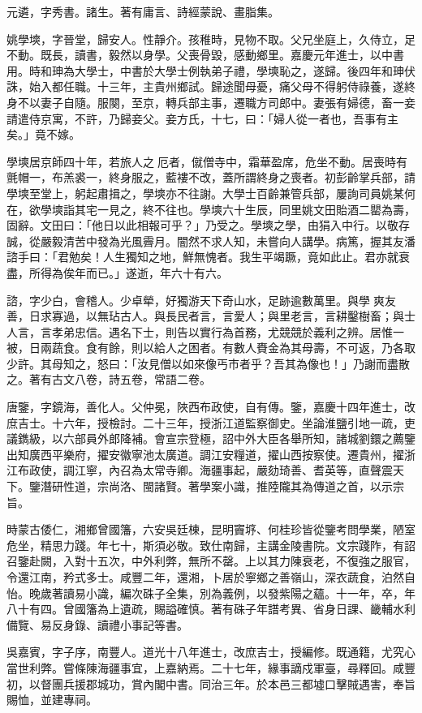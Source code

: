 \begin{pinyinscope}
元遴，字秀書。諸生。著有庸言、詩經蒙說、畫脂集。

姚學塽，字晉堂，歸安人。性靜介。孩稚時，見物不取。父兄坐庭上，久侍立，足不動。既長，讀書，毅然以身學。父喪骨毀，感動鄉里。嘉慶元年進士，以中書用。時和珅為大學士，中書於大學士例執弟子禮，學塽恥之，遂歸。後四年和珅伏誅，始入都任職。十三年，主貴州鄉試。歸途聞母憂，痛父母不得躬侍祿養，遂終身不以妻子自隨。服闋，至京，轉兵部主事，遷職方司郎中。妻張有婦德，畜一妾請遣侍京寓，不許，乃歸妾父。妾方氏，十七，曰：「婦人從一者也，吾事有主矣。」竟不嫁。

學塽居京師四十年，若旅人之厄者，僦僧寺中，霜華盈席，危坐不動。居喪時有氈帽一，布羔裘一，終身服之，藍褸不改，蓋所謂終身之喪者。初彭齡掌兵部，請學塽至堂上，躬起肅揖之，學塽亦不往謝。大學士百齡兼管兵部，屢詢司員姚某何在，欲學塽詣其宅一見之，終不往也。學塽六十生辰，同里姚文田貽酒二罌為壽，固辭。文田曰：「他日以此相報可乎？」乃受之。學塽之學，由狷入中行。以敬存誠，從嚴毅清苦中發為光風霽月。闇然不求人知，未嘗向人講學。病篤，握其友潘諮手曰：「君勉矣！人生獨知之地，鮮無愧者。我生平竭蹶，竟如此止。君亦就衰盡，所得為俟年而已。」遂逝，年六十有六。

諮，字少白，會稽人。少卓犖，好獨游天下奇山水，足跡逾數萬里。與學爽友善，日求寡過，以無玷古人。與長民者言，言愛人；與里老言，言耕鑿樹畜；與士人言，言孝弟忠信。遇名下士，則告以實行為首務，尤競競於義利之辨。居惟一被，日兩蔬食。食有餘，則以給人之困者。有數人賚金為其母壽，不可返，乃各取少許。其母知之，怒曰：「汝見僧以如來像丐巿者乎？吾其為像也！」乃謝而盡散之。著有古文八卷，詩五卷，常語二卷。

唐鑒，字鏡海，善化人。父仲冕，陜西布政使，自有傳。鑒，嘉慶十四年進士，改庶吉士。十六年，授檢討。二十三年，授浙江道監察御史。坐論淮鹽引地一疏，吏議鐫級，以六部員外郎降補。會宣宗登極，詔中外大臣各舉所知，諸城劉鐶之薦鑒出知廣西平樂府，擢安徽寧池太廣道。調江安糧道，擢山西按察使。遷貴州，擢浙江布政使，調江寧，內召為太常寺卿。海疆事起，嚴劾琦善、耆英等，直聲震天下。鑒潛研性道，宗尚洛、閩諸賢。著學案小識，推陸隴其為傳道之首，以示宗旨。

時蒙古倭仁，湘鄉曾國籓，六安吳廷棟，昆明竇垿、何桂珍皆從鑒考問學業，陋室危坐，精思力踐。年七十，斯須必敬。致仕南歸，主講金陵書院。文宗踐阼，有詔召鑒赴闕，入對十五次，中外利弊，無所不罄。上以其力陳衰老，不復強之服官，令還江南，矜式多士。咸豐二年，還湘，卜居於寧鄉之善嶺山，深衣蔬食，泊然自怡。晚歲著讀易小識，編次硃子全集，別為義例，以發紫陽之蘊。十一年，卒，年八十有四。曾國籓為上遺疏，賜謚確慎。著有硃子年譜考異、省身日課、畿輔水利備覽、易反身錄、讀禮小事記等書。

吳嘉賓，字子序，南豐人。道光十八年進士，改庶吉士，授編修。既通籍，尤究心當世利弊。嘗條陳海疆事宜，上嘉納焉。二十七年，緣事謫戍軍臺，尋釋回。咸豐初，以督團兵援郡城功，賞內閣中書。同治三年。於本邑三都墟口擊賊遇害，奉旨賜恤，並建專祠。


\end{pinyinscope}
